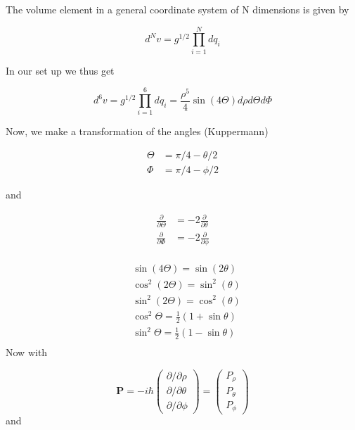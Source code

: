 \documentclass{article}
\begin{document}
The volume element in a general coordinate system of  N dimensions is given by

\begin{equation}
d^Nv = g^{1/2}\prod_{i=1}^{N} dq_i
\end{equation}

In our set up we thus get 

\begin{equation}
d^6v = g^{1/2}\prod_{i=1}^{6} dq_i = \frac{\rho^5}{4}\sin(4\Theta)d\rho d\Theta d\Phi
\end{equation}

Now, we make a transformation of the angles (Kuppermann)

\begin{align*}
	\Theta &= \pi/4-\theta/2\\
	\Phi &= \pi/4-\phi/2
\end{align*}

and

\begin{align*}
	\frac{\partial}{\partial\Theta} &= -2\frac{\partial}{\partial\theta}\\ 						\frac{\partial}{\partial\Phi} &= -2\frac{\partial}{\partial\phi}\\ 		
\end{align*}

\begin{align*}
	&\sin(4\Theta)   =\sin(2\theta)\\
	&\cos^2(2\Theta) =\sin^2(\theta)\\
	&\sin^2(2\Theta) =\cos^2(\theta)\\
	&\cos^2\Theta    =\frac{1}{2}(1+\sin\theta)\\
	&\sin^2\Theta    =\frac{1}{2}(1-\sin\theta)\\
\end{align*}
Now with

\begin{equation}
	\bm{P} = 
	-i\hbar
	\begin{pmatrix}
	\partial/\partial\rho\\
	\partial/\partial\theta\\
	\partial/\partial\phi
	\end{pmatrix}
	=
	\begin{pmatrix}
	P_{\rho}\\
	P_{\theta}\\
	P_{\phi}
	\end{pmatrix}
\end{equation}
and
\end{document}
